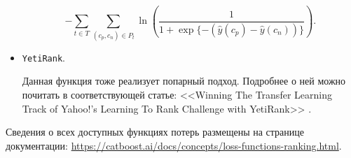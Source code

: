 \begin{itemize}
	\begin{equation*}
		-\sum\limits_{t \in T} \sum\limits_{(c_p, c_n) \in P_t} \ln\left( \frac{1}{1 + \exp\{- (\widehat{y}(c_p) - \widehat{y}(c_n)) \}} \right).
	\end{equation*}
	
	\item \verb|YetiRank|.
	
	Данная функция тоже реализует попарный подход. Подробнее о ней можно почитать в соответствующей статье: <<Winning The Transfer Learning Track of Yahoo!’s Learning To Rank Challenge with YetiRank>> \cite{Gulin2011}.
	
\end{itemize}

Сведения о всех доступных функциях потерь размещены на странице документации: \url{https://catboost.ai/docs/concepts/loss-functions-ranking.html}.
